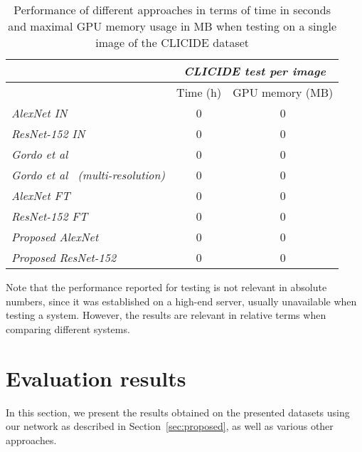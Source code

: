 \begin{table}
\begin{tabular}{|l|c|c|}
\hline & \multicolumn{2}{c|}{\emph{CLICIDE test per image}}\\
\hline & Time (h) & GPU memory (MB)\\
\hline \emph{AlexNet IN} & 0 & 0\\ %
\hline \emph{ResNet-152 IN} & 0 & 0\\
\hline \emph{Gordo et al~\cite{gordo_deep_2016}} & 0 & 0\\
\hline \emph{Gordo et al~\cite{gordo_deep_2016} (multi-resolution)}
& 0 & 0\\
\hline \emph{AlexNet FT} & 0 & 0\\ %
\hline \emph{ResNet-152 FT} & 0 & 0\\
\hline \emph{Proposed AlexNet} & 0 & 0\\ %
\hline \emph{Proposed ResNet-152} & 0 & 0\\
\hline
\end{tabular}
\caption{Performance of different approaches in terms of time in seconds and
maximal GPU memory usage in MB when testing on a single image
of the CLICIDE dataset\label{tab:perftest}}
\end{table}

Note that the performance reported for testing is not relevant in absolute numbers,
since it was established on a high-end server, usually unavailable when testing
a system. However, the results are relevant in relative terms when comparing
different systems.



\section{Evaluation results}\label{sec:evalresults}
In this section, we present the results obtained on the presented datasets
using our network as described in Section~\ref{sec:proposed}, as well
as various other approaches.

